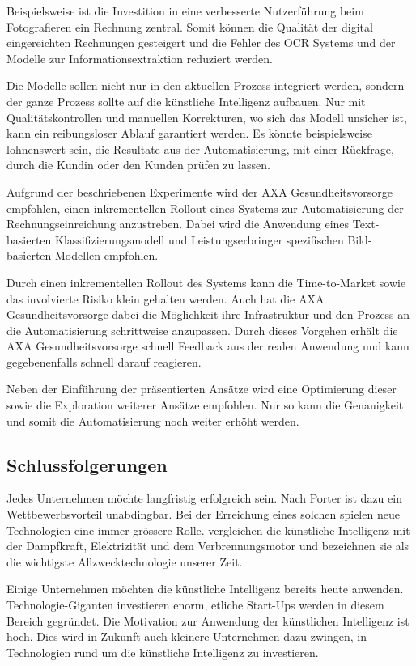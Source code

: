Beispielsweise ist die Investition in eine verbesserte Nutzerführung beim Fotografieren ein Rechnung zentral. Somit können die Qualität der digital eingereichten Rechnungen gesteigert und die Fehler des OCR Systems und der Modelle zur Informationsextraktion reduziert werden.

Die Modelle sollen nicht nur in den aktuellen Prozess integriert werden, sondern der ganze Prozess sollte auf die künstliche Intelligenz aufbauen. Nur mit Qualitätskontrollen und manuellen Korrekturen, wo sich das Modell unsicher ist, kann ein reibungsloser Ablauf garantiert werden. Es könnte beispielsweise lohnenswert sein, die Resultate aus der Automatisierung, mit einer Rückfrage, durch die Kundin oder den Kunden prüfen zu lassen.

Aufgrund der beschriebenen Experimente wird der AXA Gesundheitsvorsorge empfohlen, einen inkrementellen Rollout eines Systems zur Automatisierung der Rechnungseinreichung anzustreben. Dabei wird die Anwendung eines Text-basierten Klassifizierungsmodell und Leistungserbringer spezifischen Bild-basierten Modellen empfohlen.

Durch einen inkrementellen Rollout des Systems kann die Time-to-Market sowie das involvierte Risiko klein gehalten werden. Auch hat die AXA Gesundheitsvorsorge dabei die Möglichkeit ihre Infrastruktur und den Prozess an die Automatisierung schrittweise anzupassen. Durch dieses Vorgehen erhält die AXA Gesundheitsvorsorge schnell Feedback aus der realen Anwendung und kann gegebenenfalls schnell darauf reagieren.

Neben der Einführung der präsentierten Ansätze wird eine Optimierung dieser sowie die Exploration weiterer Ansätze empfohlen. Nur so kann die Genauigkeit und somit die Automatisierung noch weiter erhöht werden.

\subsection{Schlussfolgerungen}

Jedes Unternehmen möchte langfristig erfolgreich sein. Nach Porter ist dazu ein Wettbewerbsvorteil unabdingbar. Bei der Erreichung eines solchen spielen neue Technologien eine immer grössere Rolle. \textcite{McAfee} vergleichen die künstliche Intelligenz mit der Dampfkraft, Elektrizität und dem Verbrennungsmotor und bezeichnen sie als die wichtigste Allzwecktechnologie unserer Zeit.

Einige Unternehmen möchten die künstliche Intelligenz bereits heute anwenden. Technologie-Giganten investieren enorm, etliche Start-Ups werden in diesem Bereich gegründet. Die Motivation zur Anwendung der künstlichen Intelligenz ist hoch. Dies wird in Zukunft auch kleinere Unternehmen dazu zwingen, in Technologien rund um die künstliche Intelligenz zu investieren.

